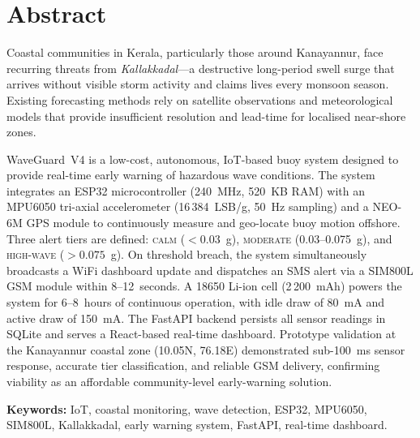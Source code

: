 

\chapter*{Abstract}

Coastal communities in Kerala, particularly those around Kanayannur, face recurring
threats from \textit{Kallakkadal}---a destructive long-period swell surge that arrives
without visible storm activity and claims lives every monsoon season.
Existing forecasting methods rely on satellite observations and meteorological models that
provide insufficient resolution and lead-time for localised near-shore zones.

WaveGuard~V4 is a low-cost, autonomous, IoT-based buoy system designed to provide
real-time early warning of hazardous wave conditions.
The system integrates an ESP32 microcontroller (240~MHz, 520~KB RAM) with an MPU6050
tri-axial accelerometer (16\,384~LSB/g, 50~Hz sampling) and a NEO-6M GPS module
to continuously measure and geo-locate buoy motion offshore.
Three alert tiers are defined: \textsc{calm} ($<0.03$~g), \textsc{moderate}
(0.03--0.075~g), and \textsc{high-wave} ($>0.075$~g).
On threshold breach, the system simultaneously broadcasts a WiFi dashboard update
and dispatches an SMS alert via a SIM800L GSM module within 8--12~seconds.
A 18650 Li-ion cell (2\,200~mAh) powers the system for 6--8~hours of continuous
operation, with idle draw of 80~mA and active draw of 150~mA.
The FastAPI backend persists all sensor readings in SQLite and serves a React-based
real-time dashboard.
Prototype validation at the Kanayannur coastal zone (10.05\textdegree{}N,
76.18\textdegree{}E) demonstrated sub-100~ms sensor response, accurate tier
classification, and reliable GSM delivery, confirming viability as an affordable
community-level early-warning solution.

\vspace{6pt}
\noindent\textbf{Keywords:} IoT, coastal monitoring, wave detection, ESP32, MPU6050,
SIM800L, Kallakkadal, early warning system, FastAPI, real-time dashboard.

